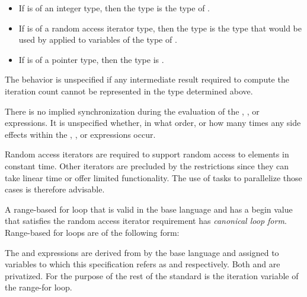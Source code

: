 \begin{itemize}
\item If  is of an integer type, then the type is the type of .
\end{itemize}        

\begin{cppspecific}
\begin{itemize}
\item If  is of a random access iterator type, then the type is the 
      type that would be used by  applied to variables of 
      the type of .
\end{itemize}
\end{cppspecific}

\begin{cspecific}
\begin{itemize}
\item If  is of a pointer type, then the type is .
\end{itemize}
\end{cspecific}

The behavior is unspecified if any intermediate result required to compute the 
iteration count cannot be represented in the type determined above.

There is no implied synchronization during the evaluation of the , , 
or  expressions. It is unspecified whether, in what order, or how many 
times any side effects within the , , or  expressions occur.

\begin{note}
Random access iterators are required to support random access to elements in
constant time. Other iterators are precluded by the restrictions since they can 
take linear time or offer limited functionality. The use of tasks to parallelize 
those cases is therefore advisable.
\end{note}

\begin{cppspecific}

A range-based for loop that is valid in the base language and has a begin value
that satisfies the random access iterator requirement has \emph{canonical loop form}.
Range-based for loops are of the following form:

\scode{: }\scode{) }


The  and  expressions are derived from
 by the base language and assigned to variables to which this
specification refers as  and  respectively.  Both
 and  are privatized.  For the purpose of the rest of
the standard  is the iteration variable of the range-for loop.

\end{cppspecific}

